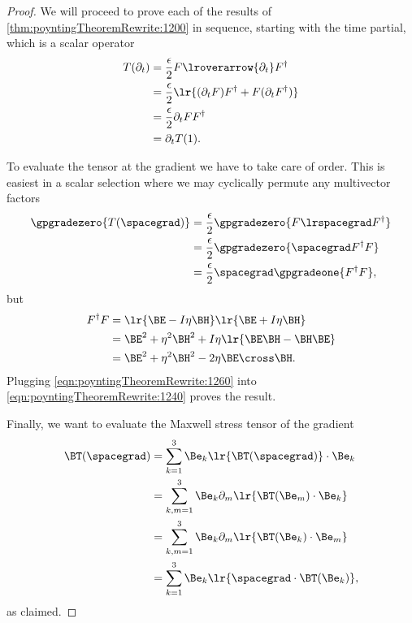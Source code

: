 \begin{proof}
We will proceed to prove each of the results of
\cref{thm:poyntingTheoremRewrite:1200} in sequence, starting with the time partial, which is a scalar operator
\begin{equation}\label{eqn:poyntingTheoremRewrite:1220}
\begin{aligned}
T(\partial_t)
&= \frac{\epsilon}{2} F \lroverarrow{\partial_t} F^\dagger \\
&= \frac{\epsilon}{2} \lr{ (\partial_t F) F^\dagger + F (\partial_t F^\dagger) } \\
&= \frac{\epsilon}{2} \partial_t F F^\dagger \\
&= \partial_t T(1).
\end{aligned}
\end{equation}

To evaluate the tensor at the gradient we have to take care of order.  This is easiest in a scalar selection where we may cyclically permute any multivector factors
\begin{equation}\label{eqn:poyntingTheoremRewrite:1240}
\begin{aligned}
\gpgradezero{T(\spacegrad)}
&= \frac{\epsilon}{2} \gpgradezero{ F \lrspacegrad F^\dagger } \\
&= \frac{\epsilon}{2} \gpgradezero{ \spacegrad F^\dagger F } \\
&= \frac{\epsilon}{2} \spacegrad \gpgradeone{ F^\dagger F },
\end{aligned}
\end{equation}
but
\begin{equation}\label{eqn:poyntingTheoremRewrite:1260}
\begin{aligned}
F^\dagger F
&= \lr{ \BE - I \eta \BH } \lr{ \BE + I \eta \BH } \\
&= \BE^2 + \eta^2 \BH^2 + I \eta \lr{ \BE \BH - \BH \BE } \\
&= \BE^2 + \eta^2 \BH^2 - 2 \eta \BE \cross \BH.
\end{aligned}
\end{equation}
Plugging \cref{eqn:poyntingTheoremRewrite:1260} into \cref{eqn:poyntingTheoremRewrite:1240} proves the result.

Finally, we want to evaluate the Maxwell stress tensor of the gradient
\begin{equation}\label{eqn:poyntingTheoremRewrite:260}
\begin{aligned}
\BT(\spacegrad)
&= \sum_{k = 1}^3 \Be_k \lr{ \BT(\spacegrad) } \cdot \Be_k \\
&= \sum_{k,m = 1}^3 \Be_k \partial_m \lr{ \BT(\Be_m) \cdot \Be_k } \\
&= \sum_{k,m = 1}^3 \Be_k \partial_m \lr{ \BT(\Be_k) \cdot \Be_m } \\
&= \sum_{k = 1}^3 \Be_k \lr{ \spacegrad \cdot \BT(\Be_k) },
\end{aligned}
\end{equation}
as claimed.
\end{proof}

